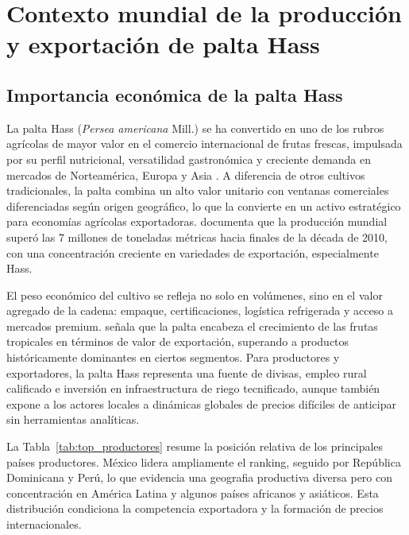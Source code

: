 \section{Contexto mundial de la producci\'on y exportaci\'on de palta Hass}

\subsection{Importancia econ\'omica de la palta Hass}

La palta Hass (\textit{Persea americana} Mill.) se ha convertido en uno de los rubros agr\'icolas de mayor valor en el comercio internacional de frutas frescas, impulsada por su perfil nutricional, versatilidad gastron\'omica y creciente demanda en mercados de Norteam\'erica, Europa y Asia \citep{ADEX2023, VitteryFlores2023}. A diferencia de otros cultivos tradicionales, la palta combina un alto valor unitario con ventanas comerciales diferenciadas seg\'un origen geogr\'afico, lo que la convierte en un activo estrat\'egico para econom\'ias agr\'icolas exportadoras. \citet{SierraSelva2020} documenta que la producci\'on mundial super\'o las 7 millones de toneladas m\'etricas hacia finales de la d\'ecada de 2010, con una concentraci\'on creciente en variedades de exportaci\'on, especialmente Hass.

El peso econ\'omico del cultivo se refleja no solo en vol\'umenes, sino en el valor agregado de la cadena: empaque, certificaciones, log\'istica refrigerada y acceso a mercados premium. \citet{FAO2026} se\~nala que la palta encabeza el crecimiento de las frutas tropicales en t\'erminos de valor de exportaci\'on, superando a productos hist\'oricamente dominantes en ciertos segmentos. Para productores y exportadores, la palta Hass representa una fuente de divisas, empleo rural calificado e inversi\'on en infraestructura de riego tecnificado, aunque tambi\'en expone a los actores locales a din\'amicas globales de precios dif\'iciles de anticipar sin herramientas anal\'iticas.

La Tabla~\ref{tab:top_productores} resume la posici\'on relativa de los principales pa\'ises productores. M\'exico lidera ampliamente el ranking, seguido por Rep\'ublica Dominicana y Per\'u, lo que evidencia una geografia productiva diversa pero con concentraci\'on en Am\'erica Latina y algunos pa\'ises africanos y asi\'aticos. Esta distribuci\'on condiciona la competencia exportadora y la formaci\'on de precios internacionales.



